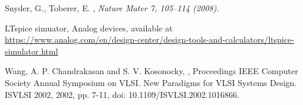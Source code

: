 \begin{thebibliography}{9}

Snyder, G., Toberer, E. , \emph{Nature Mater 7, 105–114 (2008)}.

LTspice simuator, Analog devices, available at  \url{https://www.analog.com/en/design-center/design-tools-and-calculators/ltspice-simulator.html}

Wang, A. P. Chandrakasan and S. V. Kosonocky, , Proceedings IEEE Computer Society Annual Symposium on VLSI. New Paradigms for VLSI Systems Design. ISVLSI 2002, 2002, pp. 7-11, doi: 10.1109/ISVLSI.2002.1016866.                                                                 

\end{thebibliography}
\newpage